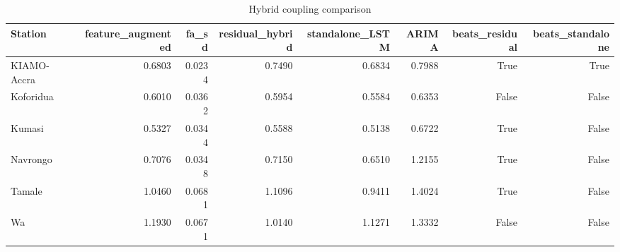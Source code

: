 \begin{table}[H]
\centering
\caption{Hybrid coupling comparison}
\label{tab:coupling}
\begin{singlespace}
\begin{tabular}{lrrrrrrr}
\toprule
Station & feature\_augmented & fa\_sd & residual\_hybrid & standalone\_LSTM & ARIMA & beats\_residual & beats\_standalone \\
\midrule
KIAMO-Accra & 0.6803 & 0.0234 & 0.7490 & 0.6834 & 0.7988 & True & True \\
Koforidua & 0.6010 & 0.0362 & 0.5954 & 0.5584 & 0.6353 & False & False \\
Kumasi & 0.5327 & 0.0344 & 0.5588 & 0.5138 & 0.6722 & True & False \\
Navrongo & 0.7076 & 0.0348 & 0.7150 & 0.6510 & 1.2155 & True & False \\
Tamale & 1.0460 & 0.0681 & 1.1096 & 0.9411 & 1.4024 & True & False \\
Wa & 1.1930 & 0.0671 & 1.0140 & 1.1271 & 1.3332 & False & False \\
\bottomrule
\end{tabular}
\end{singlespace}
\end{table}
